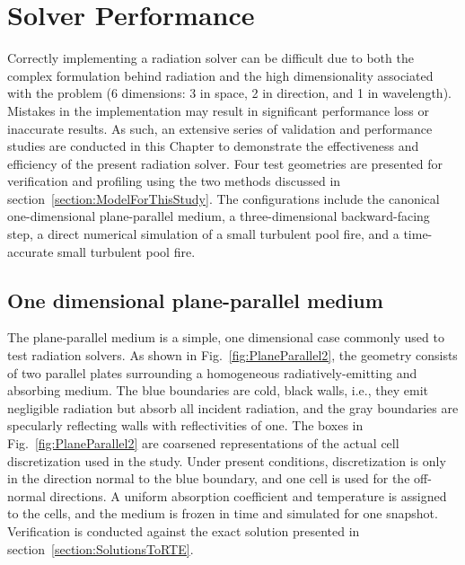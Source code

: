 \addchapheadtotoc
\chapter{Solver Performance}\label{chapter:Example}
Correctly implementing a radiation solver can be difficult due to both the complex formulation behind radiation and the high dimensionality associated with the problem (6 dimensions: 3 in space, 2 in direction, and 1 in wavelength). Mistakes in the implementation may result in significant performance loss or inaccurate results. As such, an extensive series of validation and performance studies are conducted in this Chapter to demonstrate the effectiveness and efficiency of the present radiation solver. 
Four test geometries are presented for verification and profiling using the two methods discussed in section~\ref{section:ModelForThisStudy}. 
The configurations include the canonical one-dimensional plane-parallel medium, a three-dimensional backward-facing step, a direct numerical simulation of a small turbulent pool fire, and a time-accurate small turbulent pool fire. 



\section{One dimensional plane-parallel medium}
The plane-parallel medium is a simple, one dimensional case commonly used to test radiation solvers. As shown in Fig.~\ref{fig:PlaneParallel2}, the geometry consists of two parallel plates surrounding a homogeneous radiatively-emitting and absorbing medium. The blue boundaries are cold, black walls, i.e., they emit negligible radiation but absorb all incident radiation, and the gray boundaries are specularly reflecting walls with reflectivities of one. The boxes  in Fig.~\ref{fig:PlaneParallel2} are coarsened representations of the actual cell discretization used in the study. Under present conditions, discretization is only in the direction normal to the blue boundary, and one cell is used for the off-normal directions. A uniform absorption coefficient and temperature is assigned to the cells, and the medium is frozen in time and simulated for one snapshot. Verification is conducted against the exact solution presented in section~\ref{section:SolutionsToRTE}. 

